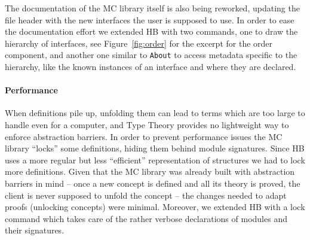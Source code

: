 \documentclass{easychair}
\def\MC{{\sf MC}}
\def\HB{{\sf HB}}
\begin{document}
The documentation of the \MC{} library itself is also being reworked, updating
the file header with the new interfaces the user is supposed to use.
In order to ease the documentation effort we extended \HB{} with two commands,
one to draw the hierarchy of interfaces, see Figure~\ref{fig:order} for the excerpt
for the order component, and another one similar to \verb+About+ to access
metadata specific to the hierarchy, like the known instances of an interface
and where they are declared.
%
%
\paragraph{Performance}

When definitions pile up, unfolding
them can lead to terms which are too large to handle even for a computer,
and Type Theory provides no lightweight way to enforce abstraction barriers.
In order to prevent performance issues the \MC{} library ``locks''
some definitions, hiding them behind module signatures.
Since \HB{} uses a more regular but less ``efficient'' representation of
structures we had to lock more definitions.
Given that the \MC{} library was already built with abstraction barriers
in mind --
once a new concept is defined and all its theory is proved, the client
is never supposed to unfold the concept -- the changes needed to adapt
proofs (unlocking concepts) were minimal. Moreover, we extended \HB{} with
a lock command which takes care of the rather verbose declarations of modules
and their signatures.
\end{document}
